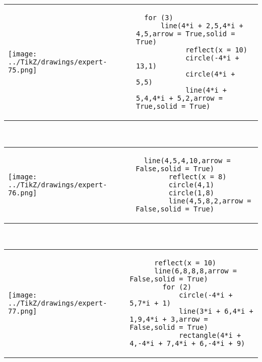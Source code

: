             \begin{tabular}{ll}
    \texttt{[image: ../TikZ/drawings/expert-75.png]}&
    
        \begin{minipage}{10cm}
        \begin{verbatim}
  for (3)
      line(4*i + 2,5,4*i + 4,5,arrow = True,solid = True)
            reflect(x = 10)
            circle(-4*i + 13,1)
            circle(4*i + 5,5)
            line(4*i + 5,4,4*i + 5,2,arrow = True,solid = True)
        \end{verbatim}
\end{minipage}

    \end{tabular}        
            \\

            \begin{tabular}{ll}
    \texttt{[image: ../TikZ/drawings/expert-76.png]}&
    
        \begin{minipage}{10cm}
        \begin{verbatim}
  line(4,5,4,10,arrow = False,solid = True)
        reflect(x = 8)
        circle(4,1)
        circle(1,8)
        line(4,5,8,2,arrow = False,solid = True)
        \end{verbatim}
\end{minipage}

    \end{tabular}        
            \\

            \begin{tabular}{ll}
    \texttt{[image: ../TikZ/drawings/expert-77.png]}&
    
        \begin{minipage}{10cm}
        \begin{verbatim}
      reflect(x = 10)
      line(6,8,8,8,arrow = False,solid = True)
        for (2)
            circle(-4*i + 5,7*i + 1)
            line(3*i + 6,4*i + 1,9,4*i + 3,arrow = False,solid = True)
            rectangle(4*i + 4,-4*i + 7,4*i + 6,-4*i + 9)
        \end{verbatim}
\end{minipage}

    \end{tabular}        
            \\

